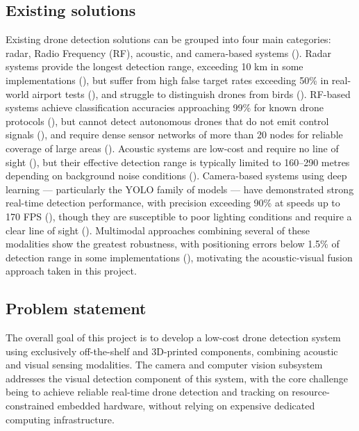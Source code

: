 \subsection{Existing solutions}

Existing drone detection solutions can be grouped into four main categories: radar, 
Radio Frequency (RF), acoustic, and camera-based systems 
(\cite{seidaliyeva2024advances, macedo2025drone}). Radar systems provide the longest 
detection range, exceeding 10 km in some implementations (\cite{macedo2025drone}), 
but suffer from high false target rates exceeding 50\% in real-world airport tests 
(\cite{macedo2025drone}), and struggle to distinguish drones from birds 
(\cite{macedo2025drone, seidaliyeva2024advances}). RF-based systems achieve 
classification accuracies approaching 99\% for known drone protocols 
(\cite{macedo2025drone}), but cannot detect autonomous drones that do not emit 
control signals (\cite{seidaliyeva2024advances}), and require dense sensor networks 
of more than 20 nodes for reliable coverage of large areas (\cite{macedo2025drone}). 
Acoustic systems are low-cost and require no line of sight 
(\cite{seidaliyeva2024advances}), but their effective detection range is typically 
limited to 160--290 metres depending on background noise conditions 
(\cite{macedo2025drone}). Camera-based systems using deep learning --- particularly 
the YOLO family of models --- have demonstrated strong real-time detection 
performance, with precision exceeding 90\% at speeds up to 170 FPS 
(\cite{macedo2025drone}), though they are susceptible to poor lighting conditions 
and require a clear line of sight (\cite{seidaliyeva2024advances, macedo2025drone}). 
Multimodal approaches combining several of these modalities show the greatest 
robustness, with positioning errors below 1.5\% of detection range in some 
implementations (\cite{macedo2025drone}), motivating the acoustic-visual fusion 
approach taken in this project.

\subsection{Problem statement}
The overall goal of this project is to develop a low-cost drone detection 
system using exclusively off-the-shelf and 3D-printed components, combining 
acoustic and visual sensing modalities. The camera and computer vision 
subsystem addresses the visual detection component of this system, with 
the core challenge being to achieve reliable real-time drone detection 
and tracking on resource-constrained embedded hardware, without relying 
on expensive dedicated computing infrastructure.

